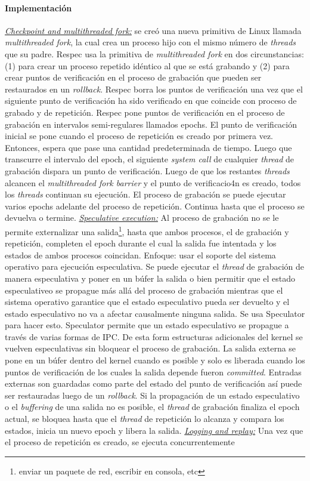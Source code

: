 \paragraph{\textnormal{\textbf{Implementación}}}
\underline{\emph{Checkpoint and multithreaded fork:}} se creó una nueva primitiva de Linux llamada \emph{multithreaded fork}, la cual crea un proceso hijo con el mismo número de \emph{threads} que su padre. Respec usa la primitiva de \emph{multithreaded fork} en dos circunstancias: (1) para crear un proceso repetido idéntico al que se está grabando y (2) para crear puntos de verificación en el proceso de grabación que pueden ser restaurados en un \emph{rollback}. Respec borra los puntos de verificación una vez que el siguiente punto de verificación ha sido verificado en que coincide con proceso de grabado y de repetición. Respec pone puntos de verificación en el proceso de grabación en intervalos semi-regulares llamados epochs. El punto de verificación inicial se pone cuando el proceso de repetición es creado por primera vez. Entonces, espera que pase una cantidad predeterminada de tiempo. Luego que transcurre el intervalo del epoch, el siguiente \emph{system call} de cualquier \emph{thread} de grabación dispara un punto de verificación. Luego de que los restantes \emph{threads} alcancen el \emph{multithreaded fork barrier} y el punto de verificacio4n es creado, todos los \emph{threads} continuan su ejecución. El proceso de grabación se puede ejecutar varios epochs adelante del proceso de repetición. Continua hasta que el proceso se devuelva o termine. \underline{\emph{Speculative execution:}} Al proceso de grabación no se le permite externalizar una salida\footnote{enviar un paquete de red, escribir en consola, etc}, hasta que ambos procesos, el de grabación y repetición, completen el epoch durante el cual la salida fue intentada y los estados de ambos procesos coincidan. Enfoque: usar el soporte del sistema operativo para ejecución especulativa. Se puede ejecutar el \emph{thread} de grabación de manera especulativa y poner en un búfer la salida o bien permitir que el estado especulativeo se propague más allá del proceso de grabación mientras que el sistema operativo garantice que el estado especulativo pueda ser devuelto y el estado especulativo no va a afectar causalmente ninguna salida. Se usa Speculator para hacer esto. Speculator permite que un estado especulativo se propague a través de varias formas de IPC. De esta form estructuras adicionales del kernel se vuelven especulativas sin bloquear el proceso de grabación. La salida externa se pone en un búfer dentro del kernel cuando es posible y solo es liberada cuando los puntos de verificación de los cuales la salida depende fueron \emph{committed}. Entradas externas son guardadas como parte del estado del punto de verificación así puede ser restauradas luego de un \emph{rollback}. Si la propagación de un estado especulativo o el \emph{buffering} de una salida no es posible, el \emph{thread} de grabación finaliza el epoch actual, se bloquea hasta que el \emph{thread} de repetición lo alcanza y compara los estados, inicia un nuevo epoch y libera la salida. \underline{\emph{Logging and replay:}} Una vez que el proceso de repetición es creado, se ejecuta concurrentemente 